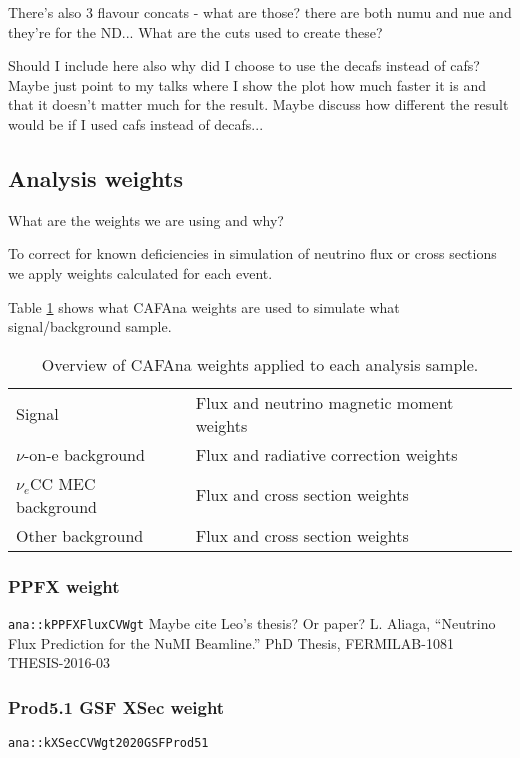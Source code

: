 There's also 3 flavour concats - what are those? there are both numu and nue and they're for the ND... What are the cuts used to create these?

Should I include here also why did I choose to use the decafs instead of cafs? Maybe just point to my talks where I show the plot how much faster it is and that it doesn't matter much for the result. Maybe discuss how different the result would be if I used cafs instead of decafs...
\fi

\subsection{Analysis weights}
What are the weights we are using and why?

To correct for known deficiencies in simulation of neutrino flux or cross sections we apply weights calculated for each event.

Table \ref{tab:WeightsOverview} shows what CAFAna weights are used to simulate what signal/background sample.

\begin{table}[!ht]
\centering
\caption{Overview of CAFAna weights applied to each analysis sample.}
\def\arraystretch{1.4}
\begin{tabular}{l@{\hskip 1in}l}
Signal                   & Flux and neutrino magnetic moment weights\\
$\nu$-on-e background    & Flux and radiative correction weights\\
$\nu_e$CC MEC background & Flux and cross section weights\\
Other background         & Flux and cross section weights
\end{tabular}
\label{tab:WeightsOverview}
\end{table}

\subsubsection*{PPFX weight}
\texttt{ana::kPPFXFluxCVWgt} \cite{NOVA-doc-23441}
Maybe cite Leo's thesis? Or paper?
L. Aliaga, “Neutrino Flux Prediction for the NuMI Beamline.” PhD Thesis, FERMILAB-1081
THESIS-2016-03


\subsubsection*{Prod5.1 GSF XSec weight}
\texttt{ana::kXSecCVWgt2020GSFProd51}

